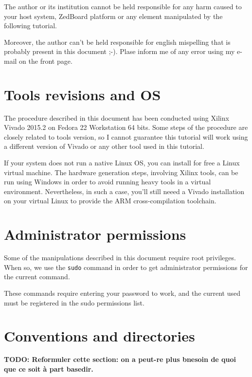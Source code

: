 \documentclass[openany,a4paper]{book}
\begin{document}
The author or its institution cannot be held responsible for any harm caused to your host system, ZedBoard platform or any element manipulated by the following tutorial.

Moreover, the author can't be held responsible for english mispelling that is probably present in this document ;-).
Plase inform me of any error using my e-mail on the front page.


\section{Tools revisions and OS}

The procedure described in this document has been conducted using Xilinx Vivado 2015.2 on Fedora 22 Workstation 64 bits.
Some steps of the procedure are closely related to tools version, so I cannot guarantee this tutorial will work using a different version of Vivado or any other tool used in this tutorial.

If your system does not run a native Linux OS, you can install for free a Linux virtual machine.
The hardware generation steps, involving Xilinx tools, can be run using Windows in order to avoid running heavy tools in a virtual environment.
Nevertheless, in such a case, you'll still neeed a Vivado installation on your virtual Linux to provide the ARM cross-compilation toolchain.


\section{Administrator permissions}

Some of the manipulations described in this document require root privileges.
When so, we use the \texttt{sudo} command in order to get administrator permissions for the current command.

These commands require entering your password to work, and the current used must be registered in the sudo permissions list.


\section{Conventions and directories}\label{section_directories}

\textbf{TODO: Reformuler cette section: on a peut-re plus bnesoin de quoi que ce soit à part basedir.}
\end{document}
